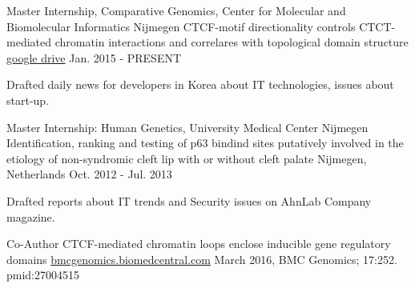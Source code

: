 

\begin{cventries}

  \cventry
    {Master Internship, Comparative Genomics,  Center for Molecular and Biomolecular Informatics Nijmegen} %
    {CTCF-motif directionality controls CTCT-mediated chromatin interactions and correlares with topological domain structure} %
    {\href{https://drive.google.com/file/d/1fE28UxBNoNXvjtaJWrduGhyCLluwIuqX/view?usp=sharing}{google drive}} %
    {Jan. 2015 - PRESENT} %
    {
      \begin{cvitems} %
        \item {Drafted daily news for developers in Korea about IT technologies, issues about start-up.}
      \end{cvitems}
    }

  \cventry
    {Master Internship: Human Genetics, University Medical Center Nijmegen} %
    {Identification, ranking and testing of p63 bindind sites putatively involved in the etiology of non-syndromic cleft lip with or without cleft palate} %
    {Nijmegen, Netherlands} %
    {Oct. 2012 - Jul. 2013} %
    {
      \begin{cvitems} %
        \item {Drafted reports about IT trends and Security issues on AhnLab Company magazine.}
      \end{cvitems}
    }


  \cventry
    {Co-Author}
    {CTCF-mediated chromatin loops enclose inducible gene regulatory domains} %
    {\href{https://www.ncbi.nlm.nih.gov/pmc/articles/PMC4804521/pdf/12864_2016_Article_2516.pdf}{bmcgenomics.biomedcentral.com}}
    {March 2016, BMC Genomics; 17:252. pmid:27004515} %
    {}
\end{cventries}

